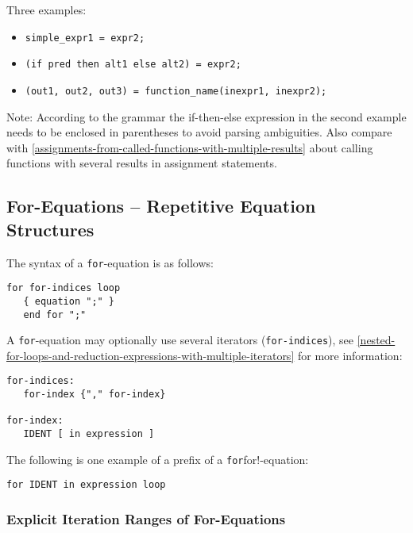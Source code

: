 Three examples:
\begin{itemize}
\item \lstinline!simple_expr1 = expr2;!
\item \lstinline!(if pred then alt1 else alt2) = expr2;!
\item \lstinline!(out1, out2, out3) = function_name(inexpr1, inexpr2);!
\end{itemize}

\begin{nonnormative}
Note: According to the grammar the if-then-else expression in
the second example needs to be enclosed in parentheses to avoid parsing
ambiguities. Also compare with \cref{assignments-from-called-functions-with-multiple-results} about calling
functions with several results in assignment statements.
\end{nonnormative}

\subsection{For-Equations -- Repetitive Equation Structures}\label{for-equations-repetitive-equation-structures}

The syntax of a \lstinline!for!-equation is as follows:
\begin{lstlisting}[language=grammar]
for for-indices loop
   { equation ";" }
   end for ";"
\end{lstlisting}

A \lstinline!for!-equation may optionally use several iterators (\lstinline[language=grammar]!for-indices!), see \cref{nested-for-loops-and-reduction-expressions-with-multiple-iterators} for more information:
\begin{lstlisting}[language=grammar]
for-indices:
   for-index {"," for-index}

for-index:
   IDENT [ in expression ]
\end{lstlisting}

The following is one example of a prefix of a \lstinline!for!for!-equation:
\begin{lstlisting}[language=grammar]
for IDENT in expression loop
\end{lstlisting}

\subsubsection{Explicit Iteration Ranges of For-Equations}\label{explicit-iteration-ranges-of-for-equations}

